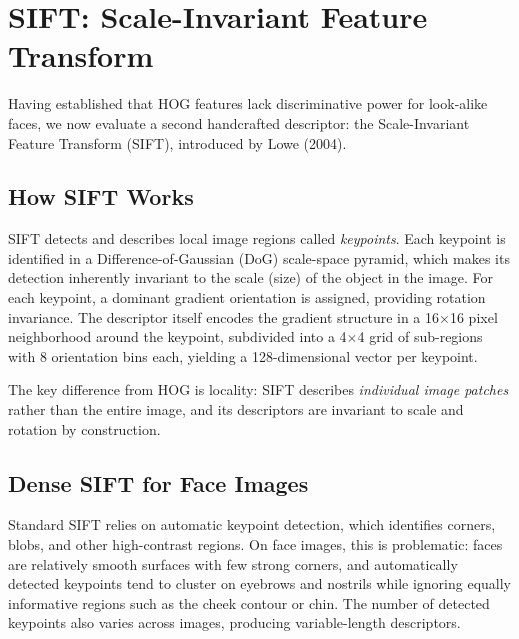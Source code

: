 \documentclass[a4paper,10pt]{article}
\begin{document}
\section{SIFT: Scale-Invariant Feature Transform}

Having established that HOG features lack discriminative power for look-alike faces, we now evaluate a second handcrafted descriptor: the Scale-Invariant Feature Transform (SIFT), introduced by Lowe (2004).

\subsection{How SIFT Works}

SIFT detects and describes local image regions called \textit{keypoints}.
Each keypoint is identified in a Difference-of-Gaussian (DoG) scale-space pyramid, which makes its detection inherently invariant to the scale (size) of the object in the image.
For each keypoint, a dominant gradient orientation is assigned, providing rotation invariance.
The descriptor itself encodes the gradient structure in a 16$\times$16 pixel neighborhood around the keypoint, subdivided into a 4$\times$4 grid of sub-regions with 8 orientation bins each, yielding a 128-dimensional vector per keypoint.

The key difference from HOG is locality: SIFT describes \textit{individual image patches} rather than the entire image, and its descriptors are invariant to scale and rotation by construction.

\subsection{Dense SIFT for Face Images}

Standard SIFT relies on automatic keypoint detection, which identifies corners, blobs, and other high-contrast regions.
On face images, this is problematic: faces are relatively smooth surfaces with few strong corners, and automatically detected keypoints tend to cluster on eyebrows and nostrils while ignoring equally informative regions such as the cheek contour or chin.
The number of detected keypoints also varies across images, producing variable-length descriptors.
\end{document}
